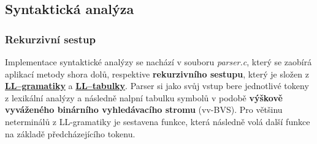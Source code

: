 \documentclass[a4paper, 12pt]{article} %
\begin{document}

        \subsection{Syntaktická analýza}\label{syntactics}
            \subsubsection{Rekurzivní sestup}
                Implementace syntaktické analýzy se nachází v souboru \textit{parser.c}, který se
                zaobírá aplikací metody shora dolů, respektive \textbf{rekurzivního sestupu}, který
                je složen z \hyperref[llgramatika]{\textbf{LL--gramatiky}} a 
                \hyperref[lltabulka]{\textbf{LL--tabulky}}. Parser si jako svůj vstup bere jednotlivé 
                tokeny z lexikální analýzy a následně nalpní tabulku symbolů v podobě \textbf{výškově 
                vyváženého binárního vyhledávacího stromu} (vv-BVS). Pro většinu neterminálů z 
                LL-gramatiky je sestavena funkce, která následně volá další funkce na základě 
                předcházejícího tokenu.
\end{document}
